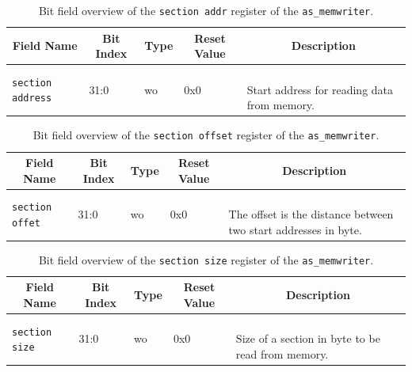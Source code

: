 \begin{longtable}[ht]{|l|l|l|l|l|}
    \hline
    \multicolumn{1}{|c|}{\textbf{Field Name}} & \multicolumn{1}{c|}{\textbf{Bit Index}} & \multicolumn{1}{c|}{\textbf{Type}} & \multicolumn{1}{c|}{\textbf{Reset Value}} & \multicolumn{1}{c|}{\textbf{Description}}\\
    \hline
    
    \texttt{section address} & 31:0 & wo & 0x0 & \parbox{5cm}{\ \\
        Start address for reading data from memory.\\
    }\\
    \hline
    
    \caption{Bit field overview of the \texttt{section addr} register of the \texttt{as\_memwriter}.}
    \label{table:memwriter-section_addr-fields}
\end{longtable}


\begin{longtable}[ht]{|l|l|l|l|l|}
    \hline
    \multicolumn{1}{|c|}{\textbf{Field Name}} & \multicolumn{1}{c|}{\textbf{Bit Index}} & \multicolumn{1}{c|}{\textbf{Type}} & \multicolumn{1}{c|}{\textbf{Reset Value}} & \multicolumn{1}{c|}{\textbf{Description}}\\
    \hline
    
    \texttt{section offet} & 31:0 & wo & 0x0 & \parbox{5cm}{\ \\
        The offset is the distance between two start addresses in byte.\\
    }\\
    \hline
    
    \caption{Bit field overview of the \texttt{section offset} register of the \texttt{as\_memwriter}.}
    \label{table:memwriter-section_offset-fields}
\end{longtable}


\begin{longtable}[ht]{|l|l|l|l|l|}
    \hline
    \multicolumn{1}{|c|}{\textbf{Field Name}} & \multicolumn{1}{c|}{\textbf{Bit Index}} & \multicolumn{1}{c|}{\textbf{Type}} & \multicolumn{1}{c|}{\textbf{Reset Value}} & \multicolumn{1}{c|}{\textbf{Description}}\\
    \hline
    
    \texttt{section size} & 31:0 & wo & 0x0 & \parbox{5cm}{\ \\
        Size of a section in byte to be read from memory.\\
    }\\
    \hline
    
    \caption{Bit field overview of the \texttt{section size} register of the \texttt{as\_memwriter}.}
    \label{table:memwriter-section_size-fields}
\end{longtable}



